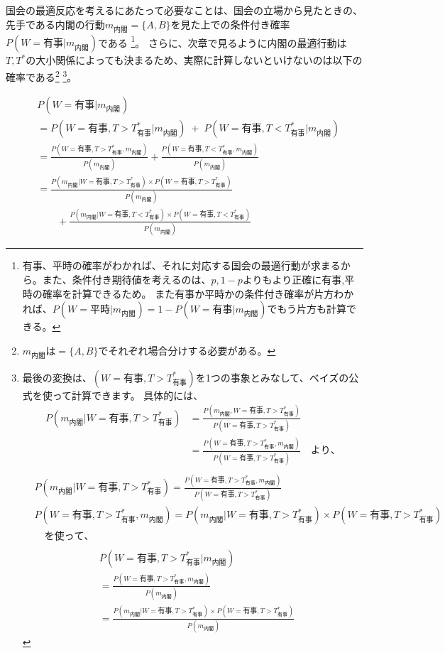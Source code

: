 \documentclass[main.tex]{subfiles}
\begin{document}
国会の最適反応を考えるにあたって必要なことは、国会の立場から見たときの、
先手である内閣の行動$m_{内閣}=\{A,B\}$を見た上での条件付き確率$P(W=有事|m_{内閣})$である
\footnote{
    有事、平時の確率がわかれば、それに対応する国会の最適行動が求まるから。また、条件付き期待値を考えるのは、$p,1-p$よりもより正確に有事,平時の確率を計算できるため。
    また有事か平時かの条件付き確率が片方わかれば、$P(W=平時|m_{内閣}) = 1-P(W=有事|m_{内閣})$でもう片方も計算できる。}。
さらに、次章で見るように内閣の最適行動は$T,T^*$の大小関係によっても決まるため、実際に計算しないといけないのは以下の確率である\footnote{$m_{内閣}$は$=\{A,B\}$でそれぞれ場合分けする必要がある。}
\footnote{最後の変換は、$(W=有事, T>T^*_{有事})$を1つの事象とみなして、ベイズの公式を使って計算できます。
具体的には、
\begin{align*}
    P(m_{内閣}|W=有事, T>T^*_{有事})
    &= \frac{ P(m_{内閣}, W=有事, T>T^*_{有事}) }{ P(W=有事, T>T^*_{有事}) }\\
    &= \frac{ P(W=有事, T>T^*_{有事},m_{内閣}) }{ P(W=有事, T>T^*_{有事}) } \quad {より、}\\
\end{align*}
\begin{align*}
    & P(m_{内閣}|W=有事, T>T^*_{有事}) = \frac{ P(W=有事, T>T^*_{有事},m_{内閣}) }{ P(W=有事, T>T^*_{有事})}\\
    & P(W=有事, T>T^*_{有事},m_{内閣}) = P(m_{内閣}|W=有事, T>T^*_{有事}) × P(W=有事, T>T^*_{有事})\\
    & \quad {を使って、}\\
\end{align*}
\begin{align*}
    & P(W=有事, T>T^*_{有事}|m_{内閣}) \\
    &= \frac{ P(W=有事, T>T^*_{有事}, m_{内閣}) }{ P(m_{内閣}) }\\
    &= \frac{ P(m_{内閣}|W=有事, T>T^*_{有事}) × P(W=有事, T>T^*_{有事}) }{ P(m_{内閣}) }
\end{align*}
}。


\begin{align*}
    &  P(W=有事|m_{内閣})\\
    &= P(W=有事, T>T^*_{有事}|m_{内閣}) \;+\; P(W=有事, T<T^*_{有事}|m_{内閣})\\[0.5em]
    &= \frac{ P(W=有事, T>T^*_{有事}, m_{内閣}) }{ P(m_{内閣}) } + \frac{ P(W=有事, T<T^*_{有事},m_{内閣}) }{ P(m_{内閣}) }\\[1em]
    &= \frac{ P(m_{内閣} | W=有事, T>T^*_{有事}) × P(W=有事, T>T^*_{有事}) }{ P(m_{内閣}) }\\[0.5em]
    &\quad\quad + \frac{ P(m_{内閣} | W=有事, T<T^*_{有事}) × P(W=有事, T<T^*_{有事}) }{ P(m_{内閣}) }   
\end{align*}
\end{document}
